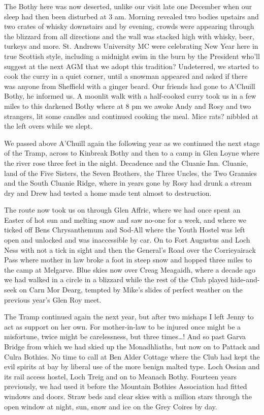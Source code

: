 \documentclass[a5paper,openany,font 10pt]{scrbook}
\begin{document}
The Bothy here was now deserted, unlike our visit late one
December when our sleep had then been disturbed at 3 am. Morning
revealed two bodies upstairs and two crates of whisky downstairs
and by evening, crowds were appearing through the blizzard from
all directions and the wall was stacked high with whisky, beer,
turkeys and more. St. Andrews University MC were celebrating New
Year here in true Scottish style, including a midnight swim in
the burn by the President  who'll suggest at the next AGM that we
adopt this tradition?  Undeterred, we started to cook the curry
in a quiet corner, until a snowman appeared and asked if there
was anyone from Sheffield with a ginger beard. Our friends had
gone to A'Chuill Bothy, he informed us. A moonlit walk with a
half-cooked curry took us in a few miles to this darkened Bothy
where at 8 pm we awoke Andy and Rosy and two strangers, lit some
candles and continued cooking the meal. Mice  rats?  nibbled at
the left overs while we slept.

We passed above A'Chuill again the following year as we
continued the next stage of the Tramp, across to Kinbreak Bothy
and then to a camp in Glen Loyne where the river rose three feet
in the night. Decadence and the Cluanie Inn. Cluanie, land of the
Five Sisters, the Seven Brothers, the Three Uncles, the Two
Grannies and the South Cluanie Ridge, where in years gone by Rosy
had drunk a stream dry and Drew had tested a home made tent
almost to destruction.

The route now took us on through Glen Affric, where we had
once spent an Easter of hot sun and melting snow and saw no-one
for a week, and where we ticked off  Bens Chrysanthemum and
Sod-All  where the Youth Hostel was left open and unlocked and
was inaccessible by car. On to Fort Augustus and Loch Ness with
not a tick in sight and then the General's Road over the
Corrieyairack Pass where mother in law broke a foot in steep snow
and hopped three miles to the camp at Melgarve. Blue skies now
over Creag Meagaidh, where a decade ago we had walked in a circle
in a blizzard while the rest of the Club played hide-and-seek on
Carn Mor Dearg, tempted by Mike's slides of perfect weather on
the previous year's Glen Roy meet.

The Tramp continued again the next year, but after two
mishaps I left Jenny to act as support on her own. For
mother-in-law to be injured once might be a misfortune, twice
might be carelessness, but three times\ldots{}!  And so past  Garva
Bridge from which we had skied up the Monadhliaths, but now on to
Pattack and Culra Bothies. No time to call at Ben Alder Cottage
where the Club had kept the evil spirits at bay by liberal use of
the more benign malted type. Loch Ossian and its rail access
hostel, Loch Treig and on to Meanach Bothy.  Fourteen years
previously, we had used it before the Mountain Bothies
Association had fitted windows and doors. Straw beds and clear
skies with a million stars through the open window at night,
sun, snow  and ice on the Grey Coires by day.
\end{document}
